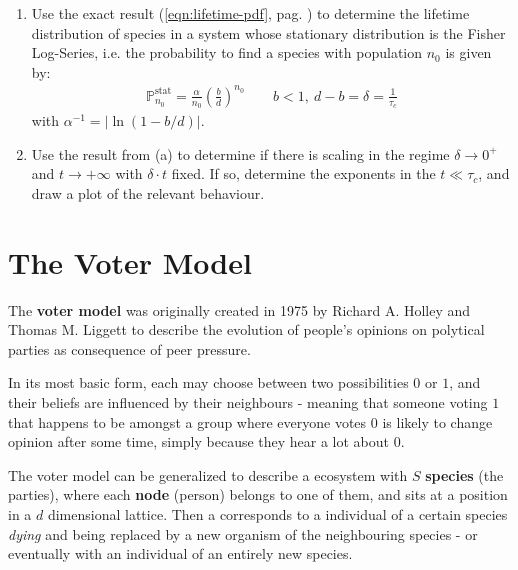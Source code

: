 \documentclass[../../main.tex]{subfiles}
\begin{document}
\begin{exo}
    \begin{enumerate}[label=(\alph*)]
        \item Use the exact result (\ref{eqn:lifetime-pdf}, pag. \pageref{eqn:lifetime-pdf}) to determine the lifetime distribution of species in a system whose stationary distribution is the Fisher Log-Series, i.e. the probability to find a species with population $n_0$ is given by:
        \begin{align*}
            \mathbb{P}_{n_0}^{\mathrm{stat} } = \frac{\alpha}{n_0} \left(\frac{b}{d} \right)^{n_0} \qquad b < 1, \> d-b = \delta = \frac{1}{\tau_c} 
        \end{align*}
        with $\alpha^{-1} = |\ln(1- b/d)|$.
        \item Use the result from (a) to determine if there is scaling in the regime $\delta \to 0^+$ and $t \to +\infty$ with $\delta \cdot t$ fixed. If so, determine the exponents in the $t \ll \tau_c$, and draw a plot of the relevant behaviour.
    \end{enumerate}    
\end{exo}

\section{The Voter Model}\label{sec:voter-model}

The \textbf{voter model} was originally created in 1975 by Richard A. Holley and Thomas M. Liggett to describe the evolution of people's opinions on polytical parties as consequence of peer pressure.

\medskip

In its most basic form, each  may choose between two possibilities $0$ or $1$, and their beliefs are influenced by their neighbours - meaning that someone voting $1$ that happens to be amongst a group where everyone votes $0$ is likely to change opinion after some time, simply because they hear a lot about $0$.

\medskip

The voter model can be generalized to describe a ecosystem with $S$ \textbf{species} (the parties), where each \textbf{node} (person) belongs to one of them, and sits at a position in a $d$ dimensional lattice. Then a  corresponds to a individual of a certain species \textit{dying} and being replaced by a new organism of the neighbouring species - or eventually with an individual of an entirely new species.  
\end{document}
